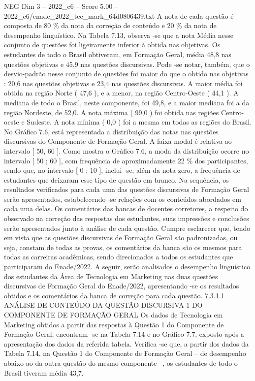\begin{textsample}{NEG Dim 3 – 2022\_c6 – Score 5.00 – 2022\_c6/enade\_2022\_tec\_mark\_64d0806439.txt}
A nota de cada questão é composta de 80 \% da nota da correção de conteúdo e 20 \% da nota de desempenho linguístico.
Na Tabela 7.13, observa -se que a nota Média nesse conjunto de questões foi ligeiramente inferior à obtida nas objetivas.
Os estudantes de todo o Brasil obtiveram, em Formação Geral, média 48,8 nas questões objetivas e 45,9 nas questões discursivas.
Pode -se notar, também, que o desvio-padrão nesse conjunto de questões foi maior do que o obtido nas objetivas : 20,6 nas questões objetivas e 23,4 nas questões discursivas.
A maior média foi obtida na região Norte ( 47,6 ), e a menor, na região Centro-Oeste ( 44,1 ).
A mediana de todo o Brasil, neste componente, foi 49,8, e a maior mediana foi a da região Nordeste, de 52,0.
A nota máxima ( 99,0 ) foi obtida nas regiões Centro-oeste e Sudeste.
A nota mínima ( 0,0 ) foi a mesma em todas as regiões do Brasil.
No Gráfico 7.6, está representada a distribuição das notas nas questões discursivas do Componente de Formação Geral.
A faixa modal é relativa ao intervalo [ 50, 60 ].
Como mostra o Gráfico 7.6, a moda da distribuição ocorre no intervalo [ 50 ; 60 ], com frequência de aproximadamente 22 \% dos participantes, sendo que, no intervalo [ 0 ; 10 ], inclui -se, além da nota zero, a frequência de estudantes que deixaram esse tipo de questão em branco.
Na sequência, os resultados verificados para cada uma das questões discursivas de Formação Geral serão apresentados, estabelecendo -se relações com os conteúdos abordados em cada uma delas.
Os comentários das bancas de docentes corretores, a respeito do observado na correção das respostas dos estudantes, suas impressões e conclusões serão apresentados junto à análise de cada questão.
Cumpre esclarecer que, tendo em vista que as questões discursivas de Formação Geral são padronizadas, ou seja, constam de todas as provas, os comentários da banca são os mesmos para todas as carreiras acadêmicas, sendo direcionados a todos os estudantes que participaram do Enade/2022.
A seguir, serão analisados o desempenho linguístico dos estudantes da Área de Tecnologia em Marketing nas duas questões discursivas de Formação Geral do Enade/2022, apresentando -se os resultados obtidos e os comentários da banca de correção para cada questão. 7.3.1.1 ANÁLISE DE CONTEÚDO DA QUESTÃO DISCURSIVA 1 DO COMPONENTE DE FORMAÇÃO GERAL Os dados de Tecnologia em Marketing obtidos a partir das respostas à Questão 1 do Componente de Formação Geral, encontram -se na Tabela 7.14 e no Gráfico 7.7, exposto após a apresentação dos dados da referida tabela.
Verifica -se que, a partir dos dados da Tabela 7.14, na Questão 1 do Componente de Formação Geral – de desempenho abaixo ao da outra questão do mesmo componente –, os estudantes de todo o Brasil tiveram média 43,7.

\end{textsample}
